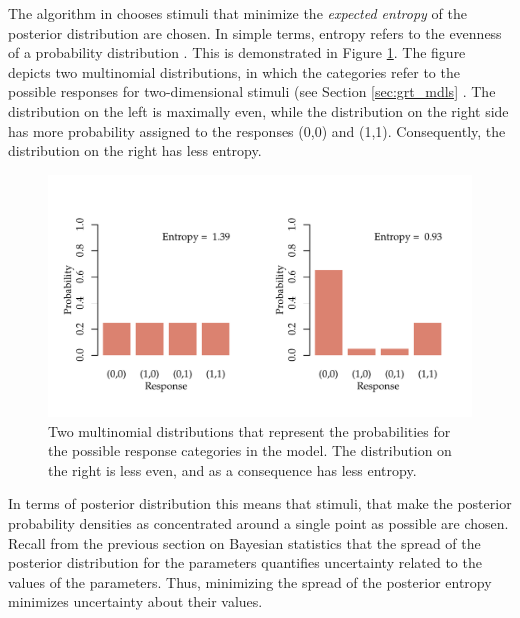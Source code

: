 \documentclass{article}\usepackage{knitr}
\begin{document}
The algorithm in \citet{kontsevichtyler1999} chooses stimuli that minimize the \textit{expected entropy} of the posterior distribution are chosen. In simple terms, entropy refers to the evenness of a probability distribution \citep[p. 365]{kruschke2015}. This is demonstrated in Figure \ref{fig:entropy}. The figure depicts two multinomial distributions, in which the categories refer to the possible responses for two-dimensional stimuli (see Section \ref{sec:grt_mdls} \textit{}. The distribution on the left is maximally even, while the distribution on the right side has more probability assigned to the responses (0,0) and (1,1). Consequently, the distribution on the right has less entropy.

\begin{figure}
\begin{center}
\begin{knitrout}
\color{fgcolor}
\includegraphics[width=\maxwidth]{figure/unnamed-chunk-14-1} 

\end{knitrout}
\end{center}
\caption{Two multinomial distributions that represent the probabilities for the possible response categories in the model. The distribution on the right is less even, and as a consequence has less entropy.}
\label{fig:entropy}
\end{figure}

In terms of posterior distribution this means that stimuli, that make the posterior probability densities as concentrated around a single point as possible are chosen. Recall from the previous section on Bayesian statistics that the spread of the posterior distribution for the parameters quantifies uncertainty related to the values of the parameters. Thus, minimizing the spread of the posterior entropy minimizes uncertainty about their values. 
\end{document}
